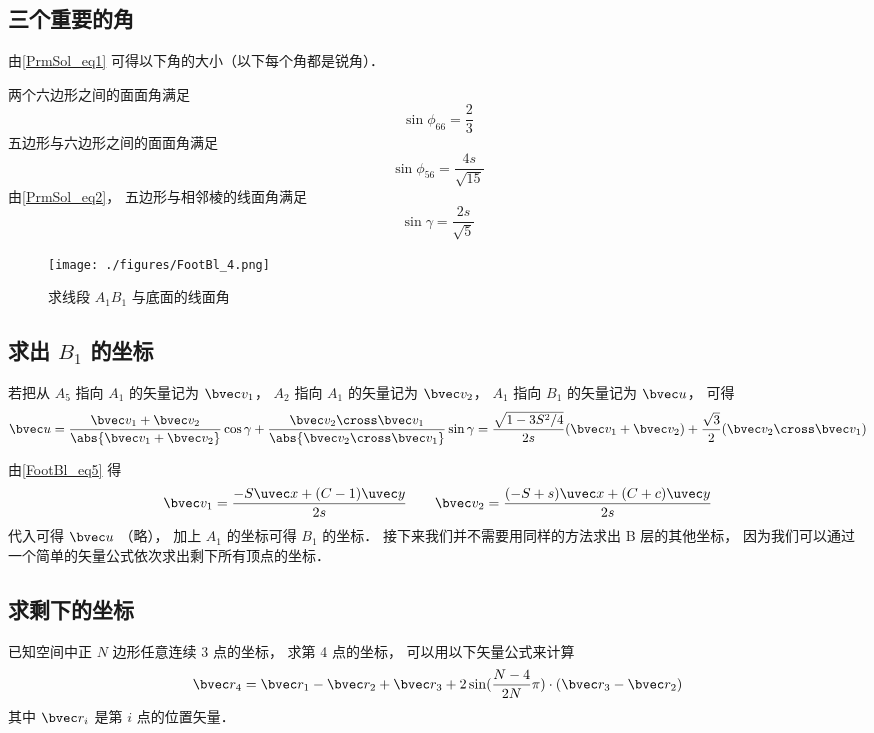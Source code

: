 \subsection{三个重要的角}
由\autoref{PrmSol_eq1} 可得以下角的大小（以下每个角都是锐角）．

两个六边形之间的面面角满足
\begin{equation}
\sin\phi_{66} = \frac{2}{3}
\end{equation}
五边形与六边形之间的面面角满足
\begin{equation}
\sin\phi_{56} = \frac{4s}{\sqrt{15}}
\end{equation}
由\autoref{PrmSol_eq2}， 五边形与相邻棱的线面角满足 %
\begin{equation}
\sin\gamma = \frac{2s}{\sqrt5}
\end{equation}

\begin{figure}[ht]
\centering
\texttt{[image: ./figures/FootBl\_4.png]}
\caption{求线段 $A_1 B_1$ 与底面的线面角} \label{FootBl_fig4}
\end{figure}

\subsection{求出 $B_1$ 的坐标}

若把从 $A_5$ 指向 $A_1$ 的矢量记为 $\bvec v_1$， $A_2$ 指向 $A_1$ 的矢量记为 $\bvec v_2$， $A_1$ 指向 $B_1$ 的矢量记为 $\bvec u$， 可得
\begin{equation}
\bvec u = \frac{\bvec v_1 + \bvec v_2}{\abs{\bvec v_1 + \bvec v_2}} \cos\gamma
+ \frac{\bvec v_2 \cross \bvec v_1}{\abs{\bvec v_2 \cross \bvec v_1}} \sin\gamma
= \frac{\sqrt{1 - 3S^2/4}}{2s} (\bvec v_1 + \bvec v_2) + \frac{\sqrt{3}}{2} (\bvec v_2 \cross \bvec v_1)
\end{equation}

由\autoref{FootBl_eq5} 得
\begin{equation}
\bvec v_1 = \frac{-S \uvec x + (C-1)\uvec y}{2s} \qquad
\bvec v_2 = \frac{(-S+s)\uvec x + (C+c)\uvec y}{2s}
\end{equation}
代入可得 $\bvec u$ （略）， 加上 $A_1$ 的坐标可得 $B_1$ 的坐标． 接下来我们并不需要用同样的方法求出 B 层的其他坐标， 因为我们可以通过一个简单的矢量公式依次求出剩下所有顶点的坐标．

\subsection{求剩下的坐标}
已知空间中正 $N$ 边形任意连续 3 点的坐标， 求第 4 点的坐标， 可以用以下矢量公式来计算
\begin{equation}\label{FootBl_eq9}
\bvec r_4 = \bvec r_1 - \bvec r_2 + \bvec r_3 + 2\sin(\frac{N-4}{2N}\pi) \cdot (\bvec r_3  - \bvec r_2)
\end{equation}
其中 $\bvec r_i$ 是第 $i$ 点的位置矢量．


